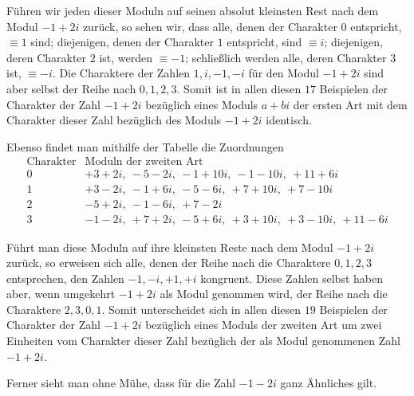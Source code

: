 Führen wir jeden dieser Moduln auf seinen absolut kleinsten Rest nach dem Modul $-1+2i$ zurück, so sehen wir, dass alle, denen der Charakter $0$ entspricht, $\equiv1$ sind; diejenigen, denen der Charakter $1$ entspricht, sind $\equiv i$; diejenigen, deren Charakter $2$ ist, werden $\equiv-1$; schließlich werden alle, deren Charakter $3$ ist, $\equiv-i$. Die Charaktere der Zahlen $1,i,-1,-i$ für den Modul $-1+2i$ sind aber selbst der Reihe nach $0,1,2,3$. Somit ist in allen diesen $17$ Beispielen der Charakter der Zahl $-1+2i$ bezüglich eines Moduls $a+bi$ der ersten Art mit dem Charakter dieser Zahl bezüglich des Moduls $-1+2i$ identisch.

Ebenso findet man mithilfe der Tabelle die Zuordnungen
\[
\begin{array}{c|l}
\text{Charakter}&\text{Moduln der zweiten Art}\\\hline
0&+3+2i,\ -5-2i,\ -1+10i,\ -1-10i,\ +11+6i\\
1&+3-2i,\ -1+6i,\ -5-6i,\ +7+10i,\ +7-10i\\
2&-5+2i,\ -1-6i,\ +7-2i\\
3&-1-2i,\ +7+2i,\ -5+6i,\ +3+10i,\ +3-10i,\ +11-6i
\end{array}
\]

Führt man diese Moduln auf ihre kleinsten Reste nach dem Modul $-1+2i$ zurück, so erweisen sich alle, denen der Reihe nach die Charaktere $0,1,2,3$ entsprechen, den Zahlen $-1,-i,+1,+i$ kongruent. Diese Zahlen selbst haben aber, wenn umgekehrt $-1+2i$ als Modul genommen wird, der Reihe nach die Charaktere $2,3,0,1$. Somit unterscheidet sich in allen diesen $19$ Beispielen der Charakter der Zahl $-1+2i$ bezüglich eines Moduls der zweiten Art um zwei Einheiten vom Charakter dieser Zahl bezüglich der als Modul genommenen Zahl $-1+2i$.

Ferner sieht man ohne Mühe, dass für die Zahl $-1-2i$ ganz Ähnliches gilt.

